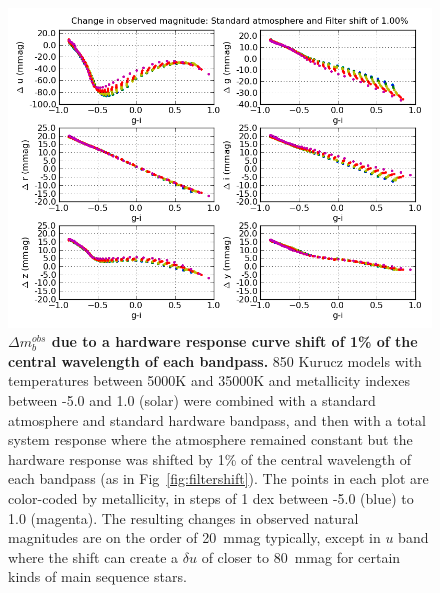 \documentclass[12pt,preprint]{aastex}
\begin{document}
\begin{figure}
\centering
\includegraphics[width=6in]{delta_mags_filtershift}
\caption{{\small 
{\bf $\Delta m_b^{obs}$
due to a hardware response curve shift of 1\% of the central
wavelength of each bandpass.}  850 Kurucz models with temperatures
between 5000K and 35000K and metallicity indexes between -5.0 and 1.0
(solar) were combined with a standard atmosphere and standard
hardware bandpass, and then with a total system response where the
atmosphere remained constant but the hardware response was shifted by
1\% of the central wavelength of each bandpass (as in
Fig~\ref{fig:filtershift}). The points in each plot are color-coded by metallicity, in
steps of 1 dex between -5.0 (blue) to 1.0 (magenta). The resulting
changes in observed 
natural magnitudes are on the order of
20~mmag typically, except in $u$ band where the shift can create a
$\delta u$ of closer to 80~mmag for certain kinds of main sequence
stars. } }
\label{fig:dmag_filtershift}
\end{figure}
\end{document}

